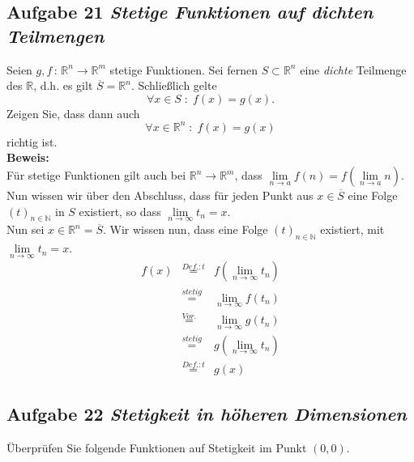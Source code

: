 \documentclass[11pt,a4paper,ngerman]{article}
\begin{document}
\subsection*{Aufgabe 21 \mdseries\itshape Stetige Funktionen auf dichten Teilmengen}

Seien $g,f \, : \, \mathbb{R}^n \rightarrow \mathbb{R}^m$ stetige Funktionen. Sei fernen $S \subset \mathbb{R}^n$ eine \emph{dichte} Teilmenge des $\mathbb{R}$, d.h. es gilt $\overline{S} = \mathbb{R}^n$. Schließlich gelte 
$$
	\forall x \in S \; : \; f(x) = g(x).
$$
Zeigen Sie, dass dann auch
$$
	\forall x \in \mathbb{R}^n \; : \; f(x) = g(x)	
$$	
richtig ist.\\

\textbf{Beweis:}\\
	Für stetige Funktionen gilt auch bei $\mathbb{R}^n\rightarrow \mathbb{R}^m$, dass
	$\underset{n \rightarrow a}{\lim} f(n) = f( \underset{n \rightarrow a}{\lim} n)$.\\

	Nun wissen wir über den Abschluss, dass für jeden Punkt aus $x \in \overline{S}$ eine Folge $(t)_{n\in\mathbb{N}}$ in $S$ existiert,
	so dass $\underset{n \rightarrow \infty}{\lim} t_n = x$.\\

	Nun sei $x \in \mathbb{R}^n = \overline{S}$. Wir wissen nun, dass eine Folge $(t)_{n \in \mathbb{N}}$ existiert, mit
	$\underset{n \rightarrow \infty}{\lim} t_n = x$.
	$$\begin{array}{rcl}
		f(x) &\stackrel{Def.: t}{=}& f(\underset{n \rightarrow \infty}{\lim} t_n)\\
			&\stackrel{stetig}{=}& \underset{n \rightarrow \infty}{\lim} f(t_n)\\
			&\stackrel{Vor.}{=}& \underset{n \rightarrow \infty}{\lim} g(t_n)\\
			&\stackrel{stetig}{=}& g( \underset{n \rightarrow \infty}{\lim} t_n)\\
			&\stackrel{Def.: t}{=}& g(x)
	\end{array}$$

\subsection*{Aufgabe 22 \mdseries\itshape Stetigkeit in höheren Dimensionen}

Überprüfen Sie folgende Funktionen auf Stetigkeit im Punkt $(0,0)$.
\end{document}
